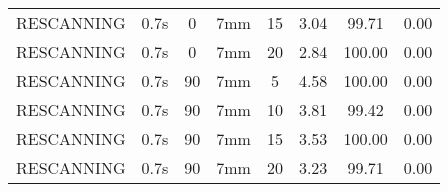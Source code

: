 \begin{table}[H]
\begin{tabular}{|c||c|c|c|c||c|c|c|}
RESCANNING & 0.7s & 0 & 7mm & 15 & 3.04 & 99.71 & 0.00 \\
RESCANNING & 0.7s & 0 & 7mm & 20 & 2.84 & 100.00 & 0.00 \\
RESCANNING & 0.7s & 90 & 7mm & 5 & 4.58 & 100.00 & 0.00 \\
RESCANNING & 0.7s & 90 & 7mm & 10 & 3.81 & 99.42 & 0.00 \\
RESCANNING & 0.7s & 90 & 7mm & 15 & 3.53 & 100.00 & 0.00 \\
RESCANNING & 0.7s & 90 & 7mm & 20 & 3.23 & 99.71 & 0.00 \\
    \hline\hline 
  \end{tabular}
  \label{tab:Pat10_RPV}
\end{table}
